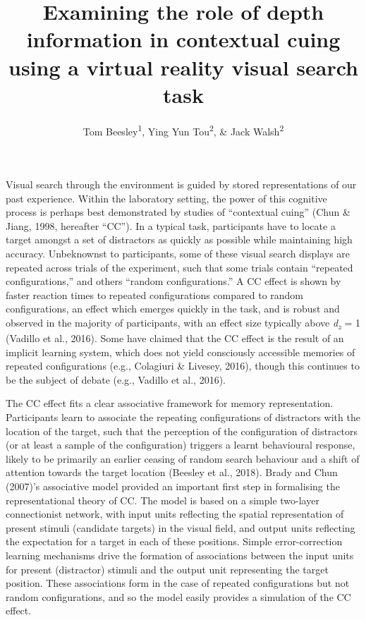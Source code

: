 \documentclass[
  english,
  man,floatsintext]{apa7}
\title{Examining the role of depth information in contextual cuing using a virtual reality visual search task}
\author{Tom Beesley\textsuperscript{1}, Ying Yun Tou\textsuperscript{2}, \& Jack Walsh\textsuperscript{2}}
\date{}
\affiliation{\vspace{0.5cm}\textsuperscript{1} Lancaster University, UK\\\textsuperscript{2} UNSW Sydney, Australia}
\begin{document}
\maketitle

Visual search through the environment is guided by stored representations of our past experience. Within the laboratory setting, the power of this cognitive process is perhaps best demonstrated by studies of ``contextual cuing'' (Chun \& Jiang, 1998, hereafter {``CC''}). In a typical task, participants have to locate a target amongst a set of distractors as quickly as possible while maintaining high accuracy. Unbeknownst to participants, some of these visual search displays are repeated across trials of the experiment, such that some trials contain ``repeated configurations,'' and others ``random configurations.'' A CC effect is shown by faster reaction times to repeated configurations compared to random configurations, an effect which emerges quickly in the task, and is robust and observed in the majority of participants, with an effect size typically above \emph{d\textsubscript{z}} = 1 (Vadillo et al., 2016). Some have claimed that the CC effect is the result of an implicit learning system, which does not yield consciously accessible memories of repeated configurations (e.g., Colagiuri \& Livesey, 2016), though this continues to be the subject of debate (e.g., Vadillo et al., 2016).

The CC effect fits a clear associative framework for memory representation. Participants learn to associate the repeating configurations of distractors with the location of the target, such that the perception of the configuration of distractors (or at least a sample of the configuration) triggers a learnt behavioural response, likely to be primarily an earlier ceasing of random search behaviour and a shift of attention towards the target location (Beesley et al., 2018). Brady and Chun (2007)'s associative model provided an important first step in formalising the representational theory of CC. The model is based on a simple two-layer connectionist network, with input units reflecting the spatial representation of present stimuli (candidate targets) in the visual field, and output units reflecting the expectation for a target in each of these positions. Simple error-correction learning mechanisms drive the formation of associations between the input units for present (distractor) stimuli and the output unit representing the target position. These associations form in the case of repeated configurations but not random configurations, and so the model easily provides a simulation of the CC effect.
\end{document}
